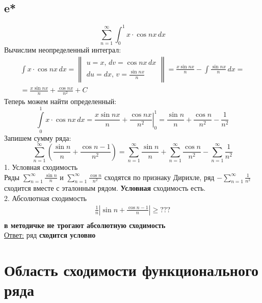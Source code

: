 \documentclass[a5paper, 10pt]{article}
\theoremstyle{definition}
\theoremstyle{plain}
\theoremstyle{remark}
\begin{document}
\subsection{e*}
\begin{equation}
\sum \limits_{n = 1}^{\infty}\int_0^1 x \cdot \cos nx \, dx
\end{equation}
Вычислим неопределенный интеграл:
\begin{multline*}
\int x \cdot \cos nx \, dx =
\begin{Vmatrix}
   u = x, \, dv =  \cos nx \, dx\\
   du = dx, \, v = \frac{\sin nx}{n}
 \end{Vmatrix}
= \frac{x\sin nx}{n} - \int \frac{\sin nx}{n} \, dx =\\ = \frac{x\sin nx}{n} + \frac{\cos nx}{n^2} + C
\end{multline*}
Теперь можем найти определенный:
\begin{equation*}
\int\limits_{0}^{1} x \cdot \cos nx \, dx = \left. \frac{x\sin nx}{n} + \frac{\cos nx}{n^2} \right|_{0}^{1} =
\frac{\sin n}{n} + \frac{\cos n}{n^2} - \frac{1}{n^2}
\end{equation*}
Запишем сумму ряда:
\begin{equation}
\sum \limits_{n = 1}^{\infty} \left(\frac{\sin n}{n} + \frac{\cos n - 1}{n^2} \right) = 
\sum \limits_{n = 1}^{\infty} \frac{\sin n}{n} +\sum \limits_{n = 1}^{\infty}  \frac{\cos n}{n^2} - \sum \limits_{n = 1}^{\infty}  \frac{1}{n^2}
\end{equation}
1. Условная сходимость\\
Ряды $\sum \limits_{n = 1}^{\infty} \frac{\sin n}{n}$ и $\sum \limits_{n = 1}^{\infty}  \frac{\cos n}{n^2}$ сходятся по признаку Дирихле, ряд $-\sum \limits_{n = 1}^{\infty}  \frac{1}{n^2}$ сходится вместе с эталонным рядом. \textbf{Условная} сходимость есть.\\
2. Абсолютная сходимость\\
\begin{multline*}
\frac{1}{n} \left|\sin n + \frac{\cos n - 1}{n} \right| \geq   ???\\
\end{multline*}
\textbf{в методичке не трогают абсолютную сходимость}\\
\underline{Ответ:} ряд  \textbf{сходится условно}


\newpage
\section{Область сходимости функционального ряда}
\end{document}
